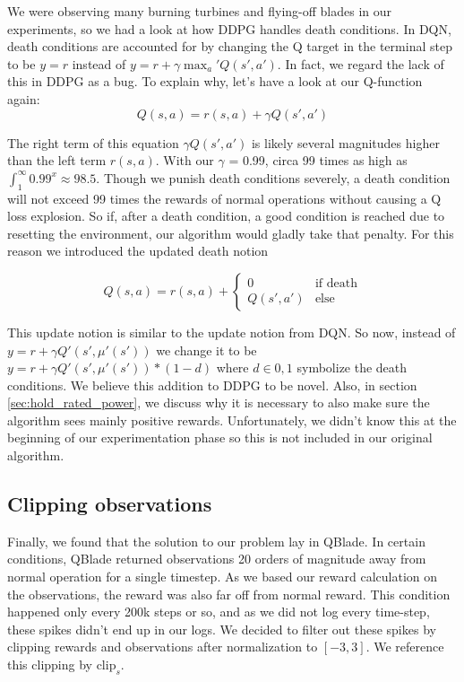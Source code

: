 \documentclass[hyperref,final,beleg]{cgvpub}
\begin{document}
We were observing many burning turbines and flying-off blades in our experiments, so we had a look at how \ac{DDPG} handles death conditions. In \ac{DQN}, death conditions are accounted for by changing the Q target in the terminal step to be $y = r$ instead of $y = r + \gamma \max_a' Q(s', a')$. In fact, we regard the lack of this in \ac{DDPG} as a bug. To explain why, let's have a look at our Q-function again:
\begin{equation}
Q(s,a) = r(s,a) + \gamma Q(s', a')
\end{equation}

The right term of this equation $\gamma Q(s', a')$ is likely several magnitudes higher than the left term $r(s,a)$. With our $\gamma$ = 0.99, circa 99 times as high as $\int_1^{\infty} 0.99^x \approx 98.5$. Though we punish death conditions severely, a death condition will not exceed 99 times the rewards of normal operations without causing a Q loss explosion. So if, after a death condition, a good condition is reached due to resetting the environment, our algorithm would gladly take that penalty. For this reason we introduced the updated death notion

\begin{equation}
Q(s,a) = r(s,a) + \begin{cases} 0& \text{if death}\\ Q(s', a') & \text{else}\end{cases}
\end{equation}

This update notion is similar to the update notion from \ac{DQN}. So now, instead of $y = r + \gamma Q'(s', \mu'(s'))$ we change it to be $y = r + \gamma Q'(s', \mu'(s')) * (1-d)$ where $d \in {0, 1}$ symbolize the death conditions. We believe this addition to \ac{DDPG} to be novel. Also, in section \ref{sec:hold_rated_power}, we discuss why it is necessary to also make sure the algorithm sees mainly positive rewards. Unfortunately, we didn't know this at the beginning of our experimentation phase so this is not included in our original algorithm.

\subsection{Clipping observations}

Finally, we found that the solution to our problem lay in QBlade. In certain conditions, QBlade returned observations 20 orders of magnitude away from normal operation for a single timestep. As we based our reward calculation on the observations, the reward was also far off from normal reward. This condition happened only every 200k steps or so, and as we did not log every time-step, these spikes didn't end up in our logs. We decided to filter out these spikes by clipping rewards and observations after normalization to $[-3, 3]$. We reference this clipping by $\text{clip}_{s}$.
\end{document}
